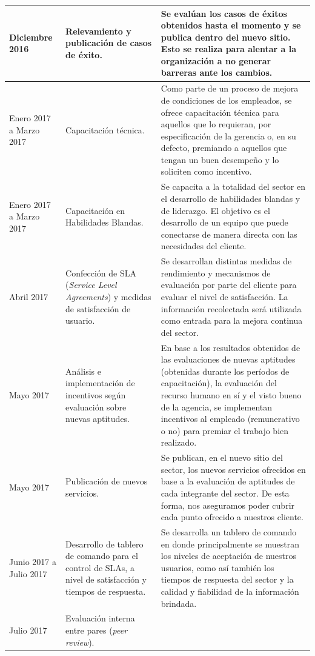 \begin{center}
\begin{longtable}{|>{\centering\arraybackslash}m{3cm}|>{\centering\arraybackslash}m{3cm}|m{7cm}|}
\hline
Diciembre 2016
&
Relevamiento y publicación de casos de éxito.
&
Se evalúan los casos de éxitos obtenidos hasta el momento y se publica dentro del nuevo sitio. Esto se realiza para alentar a la organización a no generar barreras ante los cambios.
\\
\hline
Enero 2017 a Marzo 2017
&
Capacitación técnica.
&
Como parte de un proceso de mejora de condiciones de los empleados, se ofrece capacitación técnica para aquellos que lo requieran, por especificación de la gerencia o, en su defecto, premiando a aquellos que tengan un buen desempeño y lo soliciten como incentivo.
\\
\hline
Enero 2017 a Marzo 2017
&
Capacitación en Habilidades Blandas.
&
Se capacita a la totalidad del sector en el desarrollo de habilidades blandas y de liderazgo. El objetivo es el desarrollo de un equipo que puede conectarse de manera directa con las necesidades del cliente.
\\
\hline
Abril 2017
&
Confección de SLA (\textit{Service Level Agreements}) y medidas de satisfacción de usuario.
&
Se desarrollan distintas medidas de rendimiento y mecanismos de evaluación por parte del cliente para evaluar el nivel de satisfacción. La información recolectada será utilizada como entrada para la mejora continua del sector.
\\
\hline
Mayo 2017
&
Análisis e implementación de incentivos según evaluación sobre nuevas aptitudes.
&
En base a los resultados obtenidos de las evaluaciones de nuevas aptitudes (obtenidas durante los períodos de capacitación), la evaluación del recurso humano en sí y el visto bueno de la agencia, se implementan incentivos al empleado (remunerativo o no) para premiar el trabajo bien realizado.
\\
\hline
Mayo 2017
&
Publicación de nuevos servicios.
&
Se publican, en el nuevo sitio del sector, los nuevos servicios ofrecidos en base a la evaluación de aptitudes de cada integrante del sector. De esta forma, nos aseguramos poder cubrir cada punto ofrecido a nuestros cliente.
\\
\hline
Junio 2017 a Julio 2017
&
Desarrollo de tablero de comando para el control de SLAs, a nivel de satisfacción y tiempos de respuesta.
&
Se desarrolla un tablero de comando en donde principalmente se muestran los niveles de aceptación de nuestros usuarios, como así también los tiempos de respuesta del sector y la calidad y fiabilidad de la información brindada.
\\
\hline
Julio 2017
&
Evaluación interna entre pares (\textit{peer review}).

\end{longtable}
\end{center}
